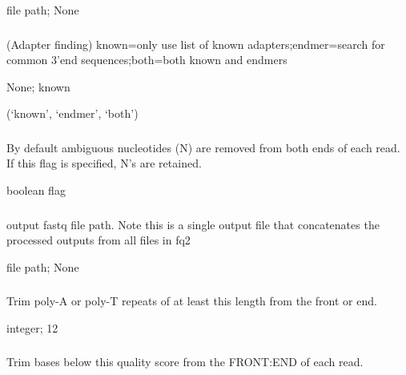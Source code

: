 \documentclass[letterpaper,11pt,english]{sphinxmanual}
\begin{document}
 file path;  None


\subsubsection{}
\label{\detokenize{prog_desc:m-adapter-mode}}
 (Adapter finding) known=only use list of known adapters;endmer=search for common 3’end sequences;both=both known and endmers

 None;  known

 (‘known’, ‘endmer’, ‘both’)


\subsubsection{}
\label{\detokenize{prog_desc:n-retain-ambig}}
 By default ambiguous nucleotides (N) are removed from both ends of each read. If this flag is specified, N’s are retained.

 boolean flag


\subsubsection{}
\label{\detokenize{prog_desc:out2}}
 output fastq file path. Note this is a single output file that concatenates the processed outputs from all files in \textendash{}fq2

 file path;  None


\subsubsection{}
\label{\detokenize{prog_desc:p-trim-poly}}
 Trim poly-A or poly-T repeats of at least this length from the front or end.

 integer;  12


\subsubsection{}
\label{\detokenize{prog_desc:q-trim-qual}}
 Trim bases below this quality score from the FRONT:END of each read.
\end{document}
